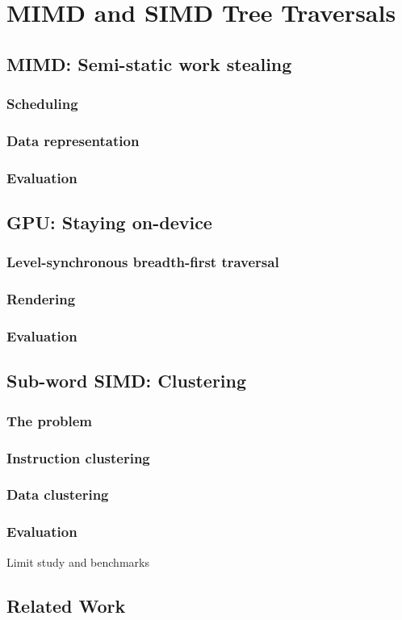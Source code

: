 \chapter{MIMD and SIMD Tree Traversals}
\section{MIMD: Semi-static work stealing}
\subsection{Scheduling}
\subsection{Data representation}
\subsection{Evaluation}
\section{GPU: Staying on-device}
\subsection{Level-synchronous breadth-first traversal}
\subsection{Rendering}
\subsection{Evaluation}
\section{Sub-word SIMD: Clustering}
\subsection{The problem}
\subsection{Instruction clustering}
\subsection{Data clustering}
\subsection{Evaluation}
Limit study and benchmarks
\section{Related Work}